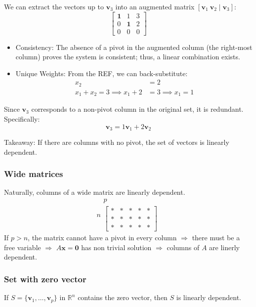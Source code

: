 \documentclass[../linear-algebra.tex]{subfiles}
\begin{document}
\noindent We can extract the vectors up to $\mathbf{v}_3$ into an augmented matrix $[\mathbf{v}_1 \ \mathbf{v}_2 \mid \mathbf{v}_3]$:
\[
\left[ \begin{array}{cc|c} 
\mathbf{1} & 1 & 3 \\ 
0 & \mathbf{1} & 2 \\ 
0 & 0 & 0 
\end{array} \right]
\]
\begin{itemize}
    \item Consistency: The absence of a pivot in the augmented column (the right-most column) proves the system is consistent; thus, a linear combination exists.
    \item Unique Weights: From the REF, we can back-substitute:
    \begin{align*}
        x_2 &= 2 \\
        x_1 + x_2 = 3 \implies x_1 + 2 &= 3 \implies x_1 = 1
    \end{align*}
\end{itemize}

\noindent Since $\mathbf{v}_3$ corresponds to a non-pivot column in the original set, it is redundant. Specifically:
\[ \mathbf{v}_3 = 1\mathbf{v}_1 + 2\mathbf{v}_2 \]

\noindent Takeaway: If there are columns with no pivot, the set of vectors is linearly dependent.

\subsubsection{Wide matrices}
Naturally, columns of a wide matrix are linearly dependent.
\[
n
\begin{array}{c}
  \scriptstyle p \\
  \left[ 
    \begin{array}{ccccc}
      * & * & * & * & * \\
      * & * & * & * & * \\
      * & * & * & * & * \end{array} 
  \right]
\end{array}
\]
If $p>n$, the matrix cannot have a pivot in every column $\Rightarrow$
there must be a free variable $\Rightarrow$ $A\mathbf{x} = \mathbf{0}$
has non trivial solution $\Rightarrow$ columns of $A$ are linerly dependent.

\subsubsection{Set with zero vector}
If $S  = \{\mathbf{v}_1,\ldots,\mathbf{v}_p\}$ in $\mathbb{R}^n$ contains
the zero vector, then $S$ is linearly dependent.
\end{document}
